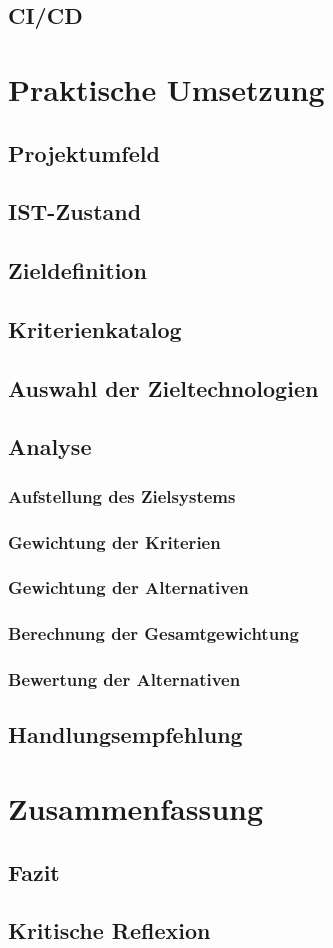 \section{CI/CD}
\chapter{Praktische Umsetzung}
\section{Projektumfeld}
\section{IST-Zustand}
\section{Zieldefinition}
\section{Kriterienkatalog}
\section{Auswahl der Zieltechnologien}
\section{Analyse}
\subsection{Aufstellung des Zielsystems}
\subsection{Gewichtung der Kriterien}
\subsection{Gewichtung der Alternativen}
\subsection{Berechnung der Gesamtgewichtung}
\subsection{Bewertung der Alternativen}
\section{Handlungsempfehlung}
\chapter{Zusammenfassung}
\section{Fazit} 
\section{Kritische Reflexion}
